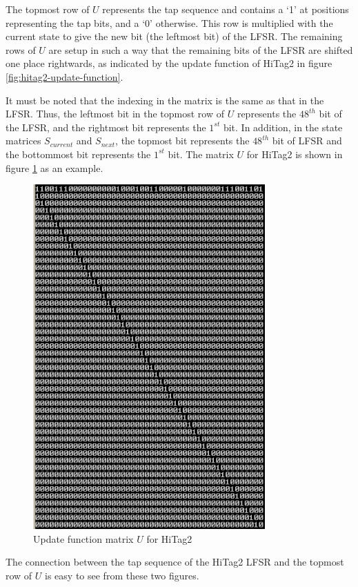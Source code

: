 The topmost row of $U$ represents the tap sequence and contains a `1' at positions representing the tap bits, and a `0' otherwise. This row is multiplied with the current state to give the new bit (the leftmost bit) of the LFSR. The remaining rows of $U$ are setup in such a way that the remaining bits of the LFSR are shifted one place rightwards, as indicated by the update function of HiTag2 in figure \ref{fig:hitag2-update-function}. 

It must be noted that the indexing in the matrix is the same as that in the LFSR. Thus, the leftmost bit in the topmost row of $U$ represents the $48^{th}$ bit of the LFSR, and the rightmost bit represents the $1^{st}$ bit. In addition, in the state matrices $S_{current}$ and $S_{next}$, the topmost bit represents the $48^{th}$ bit of LFSR and the bottommost bit represents the $1^{st}$ bit. The matrix $U$ for HiTag2 is shown in figure \ref{fig:hitag2-transition-matrix} as an example.

\begin{figure}[h!]
	\centering
	\includegraphics[width=3.5in]{./figures/hitag2-transition-matrix.png}
	\caption{Update function matrix $U$ for HiTag2}	
	\label{fig:hitag2-transition-matrix}
\end{figure}

The connection between the tap sequence of the HiTag2 LFSR and the topmost row of $U$ is easy to see from these two figures. 

